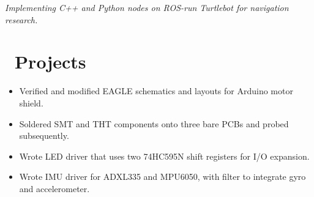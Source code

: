 \documentclass{resume}
\begin{document}
\textit{Implementing C++ and Python nodes on ROS-run Turtlebot for navigation research.}
\begin{comment}
\begin{itemize}
  \item Wrote C++ and Python nodes to implement navigation stack on Turtlebot. 
  \item Published sensor, odometry and transform messages to mobile base.
  \item Tweaked existing open-source code for advanced algorithms: person-detection, SLAM navigation.
  \item Gained immense troubleshooting experience associated with accommodating open-source software.
\end{itemize}
\end{comment}

\section{\faFlask\ Projects}

\begin{itemize}
  \item Verified and modified EAGLE schematics and layouts for Arduino motor shield. %
  \item Soldered SMT and THT components onto three bare PCBs and probed subsequently.
\end{itemize}

\begin{itemize}
  \item Wrote LED driver that uses two 74HC595N shift registers for I/O expansion.
  \item Wrote IMU driver for ADXL335 and MPU6050, with filter to integrate gyro and accelerometer.
\end{itemize}
\end{document}
